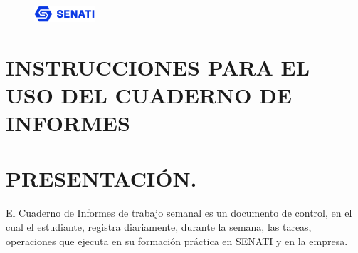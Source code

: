 \begin{figure}
    \includegraphics[width=0.2\textwidth]{img/senati.png}
\end{figure}
\section*{\centering\textbf{INSTRUCCIONES PARA EL USO DEL CUADERNO DE INFORMES}}
\section{\normalsize{ PRESENTACIÓN.}}

El Cuaderno de Informes de trabajo semanal es un documento de control, en el cual el estudiante,
registra diariamente, durante la semana, las tareas, operaciones que ejecuta en su formación
práctica en SENATI y en la empresa.

